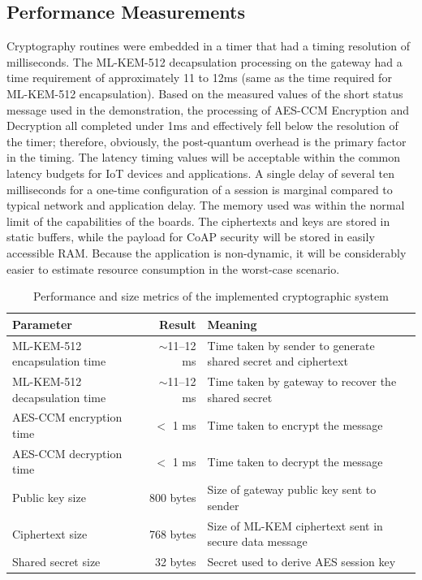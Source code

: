 \documentclass[a4paper]{scrartcl}
\begin{document}
    \subsection{Performance Measurements}
    Cryptography routines were embedded in a timer that had a timing resolution of milliseconds. The ML-KEM-512 decapsulation processing on the gateway had a time requirement of approximately 11 to 12ms (same as the time required for ML-KEM-512 encapsulation). Based on the measured values of the short status message used in the demonstration, the processing of AES-CCM Encryption and Decryption all completed under 1ms and effectively fell below the resolution of the timer; therefore, obviously, the post-quantum overhead is the primary factor in the timing. The latency timing values will be acceptable within the common latency budgets for IoT devices and applications. A single delay of several ten milliseconds for a one-time configuration of a session is marginal compared to typical network and application delay. The memory used was within the normal limit of the capabilities of the boards. The ciphertexts and keys are stored in static buffers, while the payload for CoAP security will be stored in easily accessible RAM. Because the application is non-dynamic, it will be considerably easier to estimate resource consumption in the worst-case scenario.

    \begin{table}[H]
\centering
\begin{tabular}{|l|r|p{7cm}|}
\hline
\textbf{Parameter} & \textbf{Result} & \textbf{Meaning} \\
\hline
ML-KEM-512 encapsulation time & $\sim$11--12 ms & Time taken by sender to generate shared secret and ciphertext \\
\hline
ML-KEM-512 decapsulation time & $\sim$11--12 ms & Time taken by gateway to recover the shared secret \\
\hline
AES-CCM encryption time & $<$ 1 ms & Time taken to encrypt the message \\
\hline
AES-CCM decryption time & $<$ 1 ms & Time taken to decrypt the message \\
\hline
Public key size & 800 bytes & Size of gateway public key sent to sender \\
\hline
Ciphertext size & 768 bytes & Size of ML-KEM ciphertext sent in secure data message \\
\hline
Shared secret size & 32 bytes & Secret used to derive AES session key \\
\hline
\end{tabular}
\caption{Performance and size metrics of the implemented cryptographic system}
\label{tab:crypto_results}
\end{table}
\end{document}

